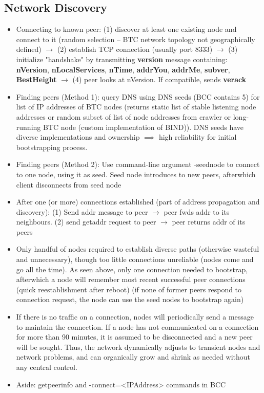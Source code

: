\documentclass[english, 11pt]{article}
\begin{document}
\subsection{Network Discovery}
\begin{itemize}
    \item Connecting to known peer: (1) discover at least one existing node and connect to it (random selection -- BTC network topology not geographically defined) $\rightarrow$ (2) establish TCP connection (usually port 8333) $\rightarrow$  (3) initialize "handshake" by transmitting \textbf{version} message containing: \textbf{nVersion}, \textbf{nLocalServices}, \textbf{nTime}, \textbf{addrYou}, \textbf{addrMe}, \textbf{subver}, \textbf{BestHeight} $\rightarrow$ (4) peer looks at nVersion. If compatible, sends \textbf{verack}
    \item Finding peers (Method 1): query DNS using DNS seeds (BCC contains 5) for list of IP addresses of BTC nodes (returns static list of stable listening node addresses or random subset of list of node addresses from crawler or long-running BTC node (custom implementation of BIND)). DNS seeds have diverse implementations and ownership $\implies$ high reliability for initial bootstrapping process. 
    \item Finding peers (Method 2): Use command-line argument -seednode to connect to one node, using it as seed. Seed node introduces to new peers, afterwhich client disconnects from seed node
    \item After one (or more) connections established (part of address propagation and discovery): (1) Send addr message to peer $\rightarrow$ peer fwds addr to its neighbours. (2) send getaddr request to peer $\rightarrow$ peer returns addr of its peers
    \item Only handful of nodes required to establish diverse paths (otherwise wasteful and unnecessary), though too little connections unreliable (nodes come and go all the time). As seen above, only one connection needed to bootstrap, afterwhich a node will remember most recent successful peer connections (quick reestablishment after reboot) (if none of former peers respond to connection request, the node can use the seed nodes to bootstrap again)\
    \item If there is no traffic on a connection, nodes will periodically send a message to maintain the connection. If a node has not communicated on a connection for more than 90 minutes, it is assumed to be disconnected and a new peer will be sought. Thus, the network dynamically adjusts to transient nodes and network problems, and can organically grow and shrink as needed without any central control.
    \item Aside: getpeerinfo and -connect=<IPAddress> commands in BCC
\end{itemize}
\end{document}
